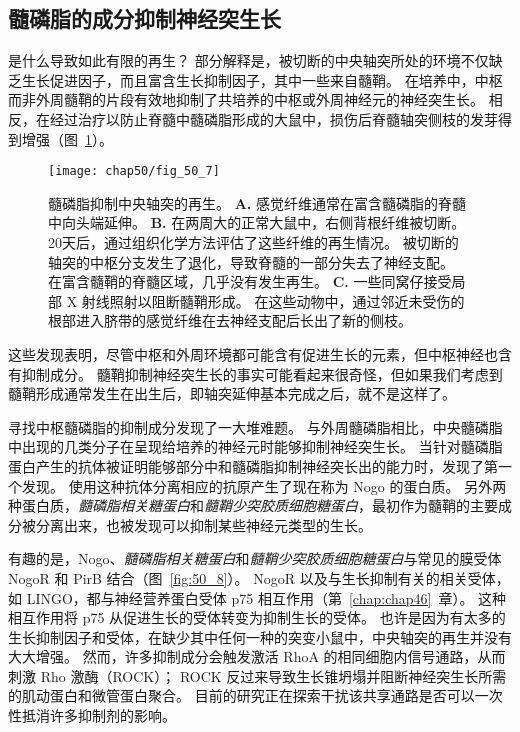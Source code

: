 \subsection{髓磷脂的成分抑制神经突生长}

是什么导致如此有限的再生？
部分解释是，被切断的中央轴突所处的环境不仅缺乏生长促进因子，而且富含生长抑制因子，其中一些来自髓鞘。
在培养中，中枢而非外周髓鞘的片段有效地抑制了共培养的中枢或外周神经元的神经突生长。
相反，在经过治疗以防止脊髓中髓磷脂形成的大鼠中，损伤后脊髓轴突侧枝的发芽得到增强（图~\ref{fig:50_7}）。


\begin{figure}[htbp]
	\centering
	\texttt{[image: chap50/fig\_50\_7]}
	\caption{髓磷脂抑制中央轴突的再生\cite{schwegler1995increased}。
		\textbf{A.} 感觉纤维通常在富含髓磷脂的脊髓中向头端延伸。
		\textbf{B.} 在两周大的正常大鼠中，右侧背根纤维被切断。
		20天后，通过组织化学方法评估了这些纤维的再生情况。
		被切断的轴突的中枢分支发生了退化，导致脊髓的一部分失去了神经支配。
		在富含髓鞘的脊髓区域，几乎没有发生再生。
		\textbf{C.} 一些同窝仔接受局部 X 射线照射以阻断髓鞘形成。
		在这些动物中，通过邻近未受伤的根部进入脐带的感觉纤维在去神经支配后长出了新的侧枝。}
	\label{fig:50_7}
\end{figure}


这些发现表明，尽管中枢和外周环境都可能含有促进生长的元素，但中枢神经也含有抑制成分。
髓鞘抑制神经突生长的事实可能看起来很奇怪，但如果我们考虑到髓鞘形成通常发生在出生后，即轴突延伸基本完成之后，就不是这样了。


寻找中枢髓磷脂的抑制成分发现了一大堆难题。
与外周髓磷脂相比，中央髓磷脂中出现的几类分子在呈现给培养的神经元时能够抑制神经突生长。
当针对髓磷脂蛋白产生的抗体被证明能够部分中和髓磷脂抑制神经突长出的能力时，发现了第一个发现。
使用这种抗体分离相应的抗原产生了现在称为 Nogo 的蛋白质。
另外两种蛋白质，\textit{髓磷脂相关糖蛋白}和\textit{髓鞘少突胶质细胞糖蛋白}，最初作为髓鞘的主要成分被分离出来，也被发现可以抑制某些神经元类型的生长。


有趣的是，Nogo、\textit{髓磷脂相关糖蛋白}和\textit{髓鞘少突胶质细胞糖蛋白}与常见的膜受体 NogoR 和 PirB 结合（图~\ref{fig:50_8}）。
NogoR 以及与生长抑制有关的相关受体，如 LINGO，都与神经营养蛋白受体 p75 相互作用（第~\ref{chap:chap46}~章）。
这种相互作用将 p75 从促进生长的受体转变为抑制生长的受体。
也许是因为有太多的生长抑制因子和受体，在缺少其中任何一种的突变小鼠中，中央轴突的再生并没有大大增强。
然而，许多抑制成分会触发激活 RhoA 的相同细胞内信号通路，从而刺激 Rho 激酶（ROCK）；
ROCK 反过来导致生长锥坍塌并阻断神经突生长所需的肌动蛋白和微管蛋白聚合。
目前的研究正在探索干扰该共享通路是否可以一次性抵消许多抑制剂的影响。


